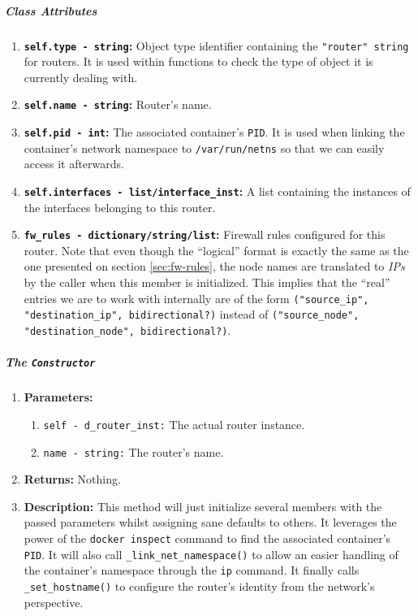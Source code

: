         \subparagraph{Class Attributes}
            \begin{enumerate}
                \item \textbf{\texttt{self.type - string}:} Object type identifier containing the \texttt{"router" string} for routers. It is used within functions to check the type of object it is currently dealing with.
                \item \textbf{\texttt{self.name - string}:} Router's name.
                \item \textbf{\texttt{self.pid - int}:} The associated container's \texttt{PID}. It is used when linking the container's network namespace to \texttt{/var/run/netns} so that we can easily access it afterwards.
                \item \textbf{\texttt{self.interfaces - list/interface\_inst}:}  A list containing the instances of the interfaces belonging to this router.
                \item \textbf{\texttt{fw\_rules - dictionary/string/list}:} Firewall rules configured for this router. Note that even though the ``logical'' format is exactly the same as the one presented on section \ref{sec:fw-rules}, the node names are translated to \textit{IPs} by the caller when this member is initialized. This implies that the ``real'' entries we are to work with internally are of the form \texttt{("source\_ip", "destination\_ip", bidirectional?)} instead of \texttt{("source\_node", "destination\_node", bidirectional?)}.
            \end{enumerate}

        \subparagraph{The \texttt{Constructor}}
            \begin{enumerate}
                \item \textbf{Parameters:}
                \begin{enumerate}
                    \item \texttt{self - d\_router\_inst:} The actual router instance.
                    \item \texttt{name - string:} The router's name.
                \end{enumerate}
                \item \textbf{Returns:} Nothing.
                \item \textbf{Description:} This method will just initialize several members with the passed parameters whilst assigning sane defaults to others. It leverages the power of the \texttt{docker inspect} command to find the associated container's \texttt{PID}. It will also call \texttt{\_link\_net\_namespace()} to allow an easier handling of the container's namespace through the \texttt{ip} command. It finally calls \texttt{\_set\_hostname()} to configure the router's identity from the network's perspective.
            \end{enumerate}

